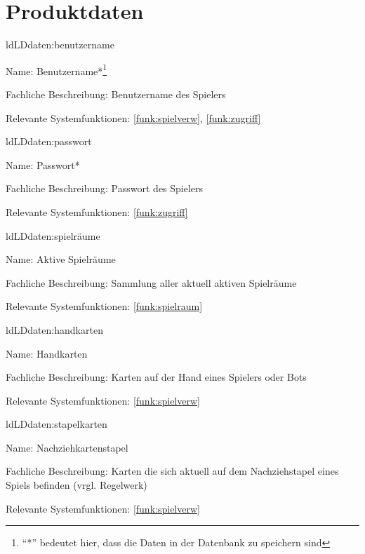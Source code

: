 
\section{Produktdaten}\label{section:productdaten}


\setcounter{ld}{10}

\begin{description}[leftmargin=5em, style=sameline]
	
	\begin{lhp}{ld}{LD}{daten:benutzername}
		\item [Name:] Benutzername*\footnote{``*'' bedeutet hier, dass die Daten in der Datenbank zu speichern sind}
		\item [Fachliche Beschreibung:] Benutzername des Spielers
		\item [Relevante Systemfunktionen:] \ref{funk:spielverw}, \ref{funk:zugriff}
	\end{lhp}
	
	\begin{lhp}{ld}{LD}{daten:passwort}
		\item [Name:] Passwort*
		\item [Fachliche Beschreibung:] Passwort des Spielers
		\item [Relevante Systemfunktionen:] \ref{funk:zugriff}
	\end{lhp}
	
		\begin{lhp}{ld}{LD}{daten:spielräume}
		\item [Name:]Aktive Spielräume
		\item [Fachliche Beschreibung:]Sammlung aller aktuell aktiven Spielräume
		\item [Relevante Systemfunktionen:]\ref{funk:spielraum}
	\end{lhp}
	
	\begin{lhp}{ld}{LD}{daten:handkarten}
		\item [Name:]Handkarten
		\item [Fachliche Beschreibung:]Karten auf der Hand eines Spielers oder Bots
		\item [Relevante Systemfunktionen:] \ref{funk:spielverw}
	\end{lhp}
	
		\begin{lhp}{ld}{LD}{daten:stapelkarten}
		\item [Name:]Nachziehkartenstapel
		\item [Fachliche Beschreibung:]Karten die sich aktuell auf dem Nachziehstapel eines Spiels befinden (vrgl. Regelwerk)
		\item [Relevante Systemfunktionen:] \ref{funk:spielverw}
	\end{lhp}
	

\end{description}
